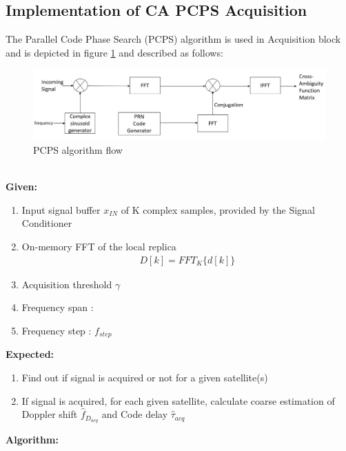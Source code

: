 \subsection{Implementation of CA PCPS Acquisition}
The Parallel Code Phase Search (PCPS) algorithm is used in Acquisition block and is depicted in figure \ref{fig:pcps_flow} and described as follows:
\begin{normalsize}
\begin{figure}[ht]
	\centering
	\includegraphics[width=1\columnwidth]{figs/pcps.jpg}
	\centering
	\captionsetup{justification=centering}
	\caption{PCPS algorithm flow}
	\label{fig:pcps_flow}
\end{figure}
\end{normalsize}
\\
\textbf{Given:}
\begin{enumerate}
	\item Input signal buffer $x_{IN}$ of K complex samples, provided by the Signal Conditioner 
	\item On-memory FFT of the local replica
	\begin{align}
		D[k]=FFT_K\{d[k]\}
	\end{align}
	\item Acquisition threshold  $\gamma$
	\item Frequency span : 
	\item Frequency step : $f_{step}$
\end{enumerate}
\textbf{Expected:}
\begin{enumerate}
	\item Find out if signal is acquired or not for a given satellite(s) 
	\item If signal is acquired, for each given satellite, calculate coarse estimation of Doppler shift $\hat f_{D_{acq}}$ and Code delay $\hat \tau_{acq}$
\end{enumerate}
\textbf{Algorithm:}
